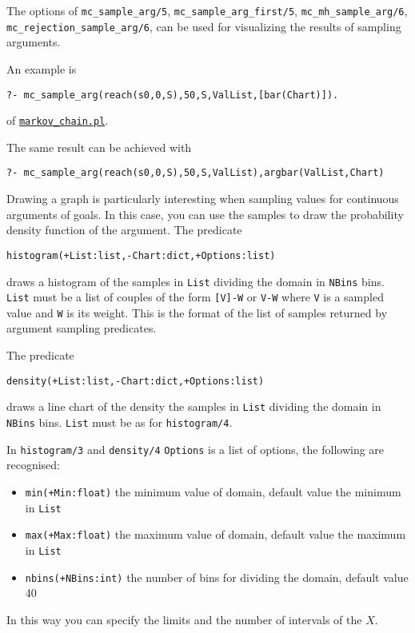 The options of
\verb|mc_sample_arg/5|, \verb|mc_sample_arg_first/5|,   \verb|mc_mh_sample_arg/6|,  \verb|mc_rejection_sample_arg/6|, 
can be used for visualizing the results of sampling arguments.

An example is
\begin{verbatim}
?- mc_sample_arg(reach(s0,0,S),50,S,ValList,[bar(Chart)]).
\end{verbatim}
of \href{http://cplint.eu/example/inference/markov_chain.pl}{\texttt{markov\_chain.pl}}.

The same result can be achieved with
\begin{verbatim}
?- mc_sample_arg(reach(s0,0,S),50,S,ValList),argbar(ValList,Chart)
\end{verbatim}
Drawing a graph is particularly interesting when
sampling values for continuous arguments of goals.
In this case, you can use the samples to draw the
probability density function of the argument.
The predicate
\begin{verbatim}
histogram(+List:list,-Chart:dict,+Options:list)
\end{verbatim}
draws a histogram of the samples in \verb|List| dividing the domain in
 \verb|NBins| bins.
\verb|List| must be a list of couples of the form \verb|[V]-W| or  \verb|V-W|
where \verb|V| is a sampled value and \verb|W| is its weight. This is the format of the list of samples returned by argument sampling predicates.

The predicate
\begin{verbatim}
density(+List:list,-Chart:dict,+Options:list)
\end{verbatim}
draws a line chart of the density the samples in \verb|List| dividing the domain in
 \verb|NBins| bins.
\verb|List| must be as for \verb|histogram/4|.

In  \verb|histogram/3| and  \verb|density/4| \verb|Options| is a list of options, the following are recognised: \begin{itemize}
\item \verb|min(+Min:float)|
the minimum value of domain, default value the minimum in \verb|List|
\item \verb|max(+Max:float)|
the maximum value of domain, default value the maximum in  \verb|List|
\item \verb|nbins(+NBins:int)|
  the number of bins for dividing the domain, default value 40
\end{itemize}
In this way you can specify the limits and the number of intervals of the $X$.


